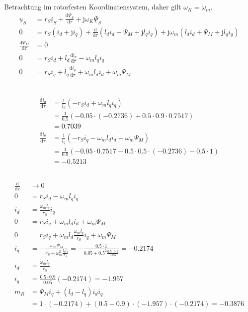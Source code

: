 \documentclass[11pt,a4paper]{scrartcl}
\newcommand{\mybr}[1]{\left(#1\right)}
\renewcommand{\j}{\mathrm{j}}
\renewcommand{\u}{\underline{u}}
\renewcommand{\i}{\underline{i}}
\newcommand{\PPsi}{\underline{\Psi}}
\newcommand{\0}{_{\mybr{0}}}
\newcommand{\1}{_{\mybr{1}}}
\newcommand{\2}{_{\mybr{2}}}
\renewcommand{\d}{\mathrm{d}}
\begin{document}
\section{}
\subsection{}
Betrachtung im rotorfesten Koordinatensystem, daher gilt $\omega_K=\omega_m$.
\begin{align}
\u_S&=r_S\i_S+\frac{\d\PPsi_S}{\d\tau}+\j\omega_K\PPsi_S\\
0&=r_S\mybr{i_d+\j i_q}+\frac{\d}{\d\tau}\mybr{l_d i_d + \Psi_M + \j l_q i_q}+\j \omega_m \mybr{l_d i_d + \Psi_M + \j l_q i_q}\\
\frac{\d\Psi_M}{\d\tau}&=0\\
0&=r_S i_d+l_d\frac{\d i_d}{\d\tau} -\omega_m l_q i_q\\
0&=r_S i_q+l_q\frac{\d i_q}{\d\tau}+\omega_m l_d i_d + \omega_m\Psi_M \\
\end{align}

\subsection{}
\begin{align}
\frac{\d i_d}{\d\tau}&=\frac{1}{l_d}\mybr{-r_S i_d+\omega_m l_q i_q}\\
&=\frac{1}{\num{0.5}}\mybr{\num{-0.05}\cdot\mybr{\num{-0.2736}}+\num{0.5}\cdot\num{0.9}\cdot\num{0.7517}}\\
&=\num{0.7039}\\
\frac{\d i_q}{\d\tau}&=\frac{1}{l_q}\mybr{-r_S i_q-\omega_m l_d i_d -\omega_m \Psi_M}\\
&=\frac{1}{\num{0.9}}\mybr{\num{-0.05}\cdot\num{0.7517}-\num{0.5}\cdot\num{0.5}\cdot\mybr{\num{-0.2736}}-\num{0.5}\cdot 1}\\
&=\num{-0.5213}
\end{align}

\subsection{}
\begin{align}
\frac{\d}{\d\tau} &\rightarrow 0\\
0&=r_S i_d -\omega_m l_q i_q\\
i_d&=\frac{\omega_m l_q}{r_S} i_q\\
0&=r_S i_q+\omega_m l_d i_d + \omega_m\Psi_M \\
0&=r_S i_q+\omega_m l_d \frac{\omega_m l_q}{r_S} i_q + \omega_m\Psi_M \\
i_q&=-\frac{\omega_m \Psi_M}{r_S+\omega_m^2\frac{l_d l_q}{r_S}}=-\frac{\num{0.5}\cdot 1}{\num{0.05}+\num{0.5}^2\frac{\num{0.5}\cdot\num{0.9}}{\num{0.05}}}=\num{-0.2174}\\
i_d&=\frac{\omega_m l_q}{r_S}\\ i_q&=\frac{\num{0.5}\cdot\num{0.9}}{\num{0.05}}\mybr{\num{-0.2174}}=\num{-1.957}\\
m_R&=\Psi_M i_q+\mybr{l_d-l_q}i_d i_q\\
&=1\cdot\mybr{\num{-0.2174}}+\mybr{\num{0.5}-\num{0.9}}\cdot\mybr{\num{-1.957}}\cdot\mybr{{\num{-0.2174}}}=\num{-0.3876}
\end{align}
\end{document}
